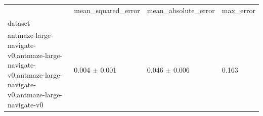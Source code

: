 \begin{tabular}{llll}
\toprule
 & mean_squared_error & mean_absolute_error & max_error \\
dataset &  &  &  \\
\midrule
antmaze-large-navigate-v0,antmaze-large-navigate-v0,antmaze-large-navigate-v0,antmaze-large-navigate-v0 & 0.004 $\pm$ 0.001 & 0.046 $\pm$ 0.006 & 0.163 \\
\bottomrule
\end{tabular}
